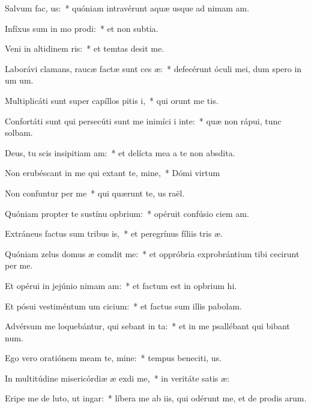 \item Salvum  fac, us:~* quóniam intravérunt aquæ usque ad nimam am.
\item Infíxus sum in mo prodi:~* et non  subtia.
\item Veni in altidinem ris:~* et temtas desit me.
\item Laborávi clamans, raucæ factæ sunt ces æ:~* defecérunt óculi mei, dum spero in um um.
\item Multiplicáti sunt super capíllos pitis i,~* qui orunt me tis.
\item Confortáti sunt qui persecúti sunt me inimíci i inte:~* quæ non rápui, tunc solbam.
\item Deus, tu scis insipitiam am:~* et delícta mea a te non  absdita.
\item Non erubéscant in me qui extant te, mine,~* Dómi virtum
\item Non confuntur per me~* qui quærunt te, us raël.
\item Quóniam propter te sustínu opbrium:~* opéruit confúsio ciem am.
\item Extráneus factus sum tribus is,~* et peregrínus fíliis tris æ.
\item Quóniam zelus domus æ comdit me:~* et oppróbria exprobrántium tibi cecirunt per me.
\item Et opérui in jejúnio nimam am:~* et factum est in opbrium hi.
\item Et pósui vestiméntum um cicium:~* et factus sum illis  pabolam.
\item Advérsum me loquebántur, qui sebant in ta:~* et in me psallébant qui bibant num.
\item Ego vero oratiónem meam  te, mine:~* tempus beneciti, us.
\item In multitúdine misericórdiæ æ exdi me,~* in veritáte satis æ:
\item Eripe me de luto, ut  ingar:~* líbera me ab iis, qui odérunt me, et de prodis arum.
